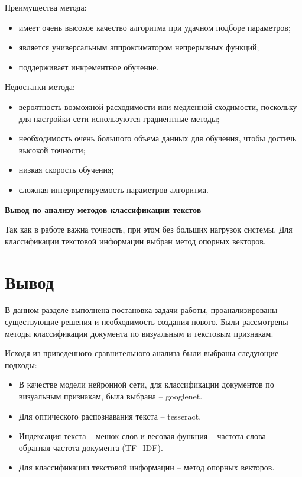Преимущества метода:
\begin{itemize}
\item имеет очень высокое качество алгоритма при удачном подборе параметров;
\item является универсальным аппроксиматором непрерывных функций; 
\item поддерживает инкрементное обучение. 
\end{itemize}

Недостатки метода: 
\begin{itemize}
\item вероятность возможной расходимости или медленной сходимости, поскольку для настройки сети используются градиентные методы;
\item необходимость очень большого объема данных для обучения, чтобы достичь высокой точности;
\item низкая скорость обучения;
\item сложная интерпретируемость параметров алгоритма.
\end{itemize}

\textbf{Вывод по анализу методов классификации текстов}

Так как в работе важна точность, при этом без больших нагрузок системы. Для классификации текстовой информации выбран метод опорных векторов.

\section{Вывод}

В данном разделе выполнена постановка задачи работы, проанализированы существующие решения и необходимость создания нового. Были рассмотрены методы классификации документа по визуальным и текстовым признакам. 

Исходя из приведенного сравнительного анализа были выбраны следующие подходы:
\begin{itemize}
\item В качестве модели нейронной сети, для классификации документов по визуальным признакам, была выбрана -- googlenet.
\item Для оптического распознавания текста -- tesseract.
\item Индексация текста -- мешок слов и весовая функция -- частота слова -- обратная частота документа (TF\_IDF).
\item Для классификации текстовой информации -- метод опорных векторов.
\end{itemize}
